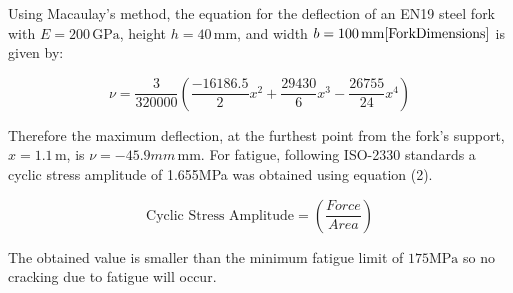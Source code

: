 \documentclass[12pt]{article}
\begin{document}
Using Macaulay's method, the equation for the deflection of an EN19 steel fork with \( E = 200 \, \text{GPa} \), height \( h = 40 \, \text{mm} \), and width \( b = 100 \, \text{mm} \cite{ForkDimensions} \) is given by:

\vspace{-20pt}
\begin{equation}
   \nu = \frac{3}{320000} \left( \frac{-16186.5}{2}x^2 + \frac{29430}{6}x^3 - \frac{26755}{24}x^4 \right)
\end{equation}
\vspace{-20pt}

Therefore the maximum deflection, at the furthest point from the fork's support, \(x = 1.1 \, \text{m}\), is \(\nu = -45.9mm \, \text{mm}\).
For fatigue, following ISO-2330 standards a cyclic stress amplitude of 1.655MPa was obtained using equation (2).

\vspace{-20pt}
\begin{equation}
   \text{Cyclic Stress Amplitude} = \left (\frac{Force}{Area} \right)
\end{equation}
\vspace{-20pt}

The obtained value is smaller than the minimum fatigue limit of \(175 \text{MPa}\) so no cracking due to fatigue will occur.
\end{document}
